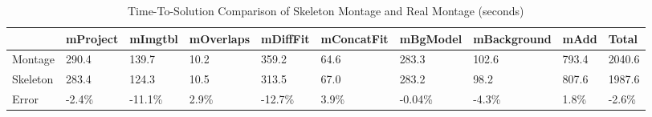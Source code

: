 \documentclass{sig-alternate}
\newcommand{\up}{\vspace*{-1em}}
\begin{document}
\begin{table}[]
\begin{center}
    \caption{Time-To-Solution Comparison of Skeleton Montage and Real Montage (seconds)}
    \begin{scriptsize}
    \begin{tabular}{ | p{1cm} | p{1cm} | p{1cm} | p{1.2cm} | p{1cm} | p{1.4cm} | p{1.2cm} | p{1.8cm} | p{1cm} | p{1cm} |}
    \hline
	& mProject & mImgtbl & mOverlaps & mDiffFit & mConcatFit & mBgModel & mBackground & mAdd & Total\\ \hline \hline
	Montage & 290.4 & 139.7 & 10.2 & 359.2 & 64.6 & 283.3 & 102.6 &  793.4 & 2040.6\\ \hline
	Skeleton & 283.4 & 124.3 & 10.5 & 313.5 & 67.0 & 283.2 & 98.2 &  807.6 & 1987.6\\ \hline
	Error & -2.4\% & -11.1\% & 2.9\% & -12.7\% & 3.9\% & -0.04\% & -4.3\% & 1.8\% & -2.6\%\\ \hline
    \end{tabular}
    \end{scriptsize}
    \label{tb:results}
    \up\up
\end{center}   
\end{table}
\end{document}

